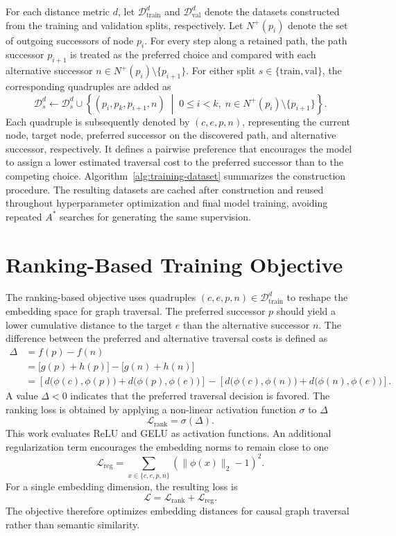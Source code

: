 For each distance metric $d$, let $\mathcal{D}_{\mathrm{train}}^d$ and $\mathcal{D}_{\mathrm{val}}^d$ denote the datasets constructed from the training and validation splits, respectively. Let $N^+(p_i)$ denote the set of outgoing successors of node $p_i$. For every step along a retained path, the path successor $p_{i+1}$ is treated as the preferred choice and compared with each alternative successor $n\in N^+(p_i)\setminus\{p_{i+1}\}$. For either split $s\in\{\mathrm{train},\mathrm{val}\}$, the corresponding quadruples are added as
\[
\mathcal{D}_s^d \gets \mathcal{D}_s^d \cup
\left\{
(p_i,p_k,p_{i+1},n)
\;\middle|\;
0\leq i<k,\;
n\in N^+(p_i)\setminus\{p_{i+1}\}
\right\}.
\]
Each quadruple is subsequently denoted by $(c,e,p,n)$, representing the current node, target node, preferred successor on the discovered path, and alternative successor, respectively. It defines a pairwise preference that encourages the model to assign a lower estimated traversal cost to the preferred successor than to the competing choice. Algorithm~\ref{alg:training-dataset} summarizes the construction procedure. The resulting datasets are cached after construction and reused throughout hyperparameter optimization and final model training, avoiding repeated $A^*$ searches for generating the same supervision.


\section{Ranking-Based Training Objective}
\label{sec:train_objective}

The ranking-based objective uses quadruples $(c,e,p,n)\in \mathcal{D}_{\mathrm{train}}^d$ to reshape the embedding space for graph traversal. The preferred successor $p$ should yield a lower cumulative distance to the target $e$ than the alternative successor $n$. The difference between the preferred and alternative traversal costs is defined as
\[
\begin{aligned}
\Delta &= f(p)-f(n) \\
&= \bigl[g(p)+h(p)\bigr]-\bigl[g(n)+h(n)\bigr] \\
&=
\left[
d\bigl(\phi(c),\phi(p)\bigr)
+
d\bigl(\phi(p),\phi(e)\bigr)
\right]
-
\left[
d\bigl(\phi(c),\phi(n)\bigr)
+
d\bigl(\phi(n),\phi(e)\bigr)
\right].
\end{aligned}
\]
A value $\Delta<0$ indicates that the preferred traversal decision is favored. The ranking loss is obtained by applying a non-linear activation function $\sigma$ to $\Delta$
\[
\mathcal{L}_{\mathrm{rank}}=\sigma(\Delta).
\]
This work evaluates ReLU and GELU as activation functions. An additional regularization term encourages the embedding norms to remain close to one
\[
\mathcal{L}_{\mathrm{reg}}
=
\sum_{x\in\{c,e,p,n\}}
\left(\lVert\phi(x)\rVert_2-1\right)^2.
\]
For a single embedding dimension, the resulting loss is
\[
\mathcal{L}
=
\mathcal{L}_{\mathrm{rank}}+\mathcal{L}_{\mathrm{reg}}.
\]
The objective therefore optimizes embedding distances for causal graph traversal rather than semantic similarity.


